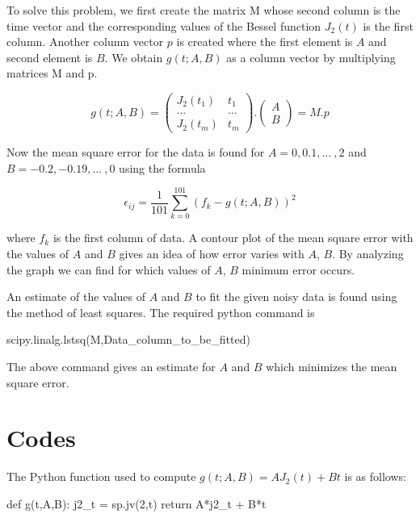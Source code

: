 \documentclass[12pt, a4paper]{report}
\begin{document}
To solve this problem, we first create the matrix M whose second column is
the time vector and the corresponding values of the Bessel function
$J_{2}(t)$ is the first column. Another column vector $p$ is created where
the first element is $A$ and second element is $B$. We obtain $g(t;A,B)$ as a column vector
by multiplying matrices M and p.

    \begin{equation}\label{eq3}
        g(t;A,B) = \begin{pmatrix}
            J_{2}(t_{1}) & t_{1}\\
            \ldots      &  \ldots\\
            J_{2}(t_{m}) & t_{m}
        \end{pmatrix}
        .
        \begin{pmatrix}
            A\\B
        \end{pmatrix}
        = M.p
    \end{equation}

Now the mean square error for the data is found for $A=0,0.1,\ldots\ ,2$
and $B=-0.2,-0.19,\ldots\ ,0$ using the formula

\begin{equation}\label{eq4}
    \epsilon _{ij} = \frac{1}{101} \sum\limits_{k=0}^{101} (f_{k}-g(t;A,B))^{2}
\end{equation}

where $f_{k}$ is the first column of data. A contour plot of the mean square error
with the values of $A$ and $B$ gives an idea of how error varies with $A$, $B$.
 By analyzing the graph we can find for which values of $A$, $B$ minimum error occurs.

An estimate of the values of $A$ and $B$ to fit the given noisy data is found using the
method of least squares. The required python command is
\begin{psudo}
    scipy.linalg.lstsq(M,Data_column_to_be_fitted)
\end{psudo}

The above command gives an estimate for $A$ and $B$ which minimizes the mean square error.
\section*{Codes}
The Python function used to compute $g(t;A,B)=AJ_{2}(t)+Bt$ is as follows:

\begin{py_code}
    def g(t,A,B):
        j2_t = sp.jv(2,t)
        return A*j2_t + B*t
\end{py_code}
\end{document}
